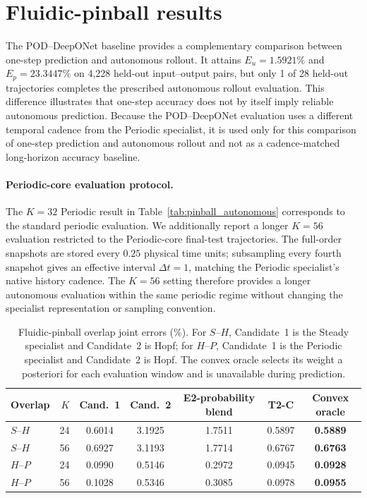 \documentclass{article}
\begin{document}
\FloatBarrier
\section{Fluidic-pinball results}
\label{app:pinball}

The POD--DeepONet baseline provides a complementary comparison between
one-step prediction and autonomous rollout. It attains $E_u=1.5921\%$ and $E_p=23.3447\%$ on 4,228 held-out input--output pairs, but only 1 of 28 held-out trajectories completes the prescribed autonomous rollout evaluation. This difference illustrates that one-step accuracy does not by itself imply reliable autonomous prediction. Because the POD--DeepONet evaluation uses a different temporal cadence from
the Periodic specialist, it is used only for this comparison of one-step prediction and autonomous rollout and not as a cadence-matched long-horizon accuracy baseline.

\paragraph{Periodic-core evaluation protocol.}
The $K=32$ Periodic result in Table~\ref{tab:pinball_autonomous} corresponds to the standard periodic evaluation. We additionally report a longer $K=56$ evaluation restricted to the Periodic-core final-test trajectories. The full-order snapshots are stored every $0.25$ physical time units; subsampling every fourth snapshot gives an effective interval $\Delta t=1$, matching the Periodic specialist's native history cadence. The $K=56$ setting therefore provides a longer autonomous evaluation within the same periodic regime without changing the specialist representation or
sampling convention.

\par
\begin{table}[H]
\centering
\caption{
Fluidic-pinball overlap joint errors (\%). For $S$--$H$, Candidate~1 is the Steady specialist and Candidate~2 is Hopf; for $H$--$P$, Candidate~1 is the Periodic specialist and Candidate~2 is Hopf.
The convex oracle selects its weight a posteriori for each evaluation window and is unavailable during prediction.
}
\label{tab:pinball_overlap}
\small
\setlength{\tabcolsep}{3.5pt}
\begin{tabular}{lrccccc}
\toprule
Overlap & $K$ & Cand.~1 & Cand.~2 & E2-probability blend & T2-C & Convex oracle \\
\midrule
$S$--$H$ & 24 & 0.6014 & 3.1925 & 1.7511 & 0.5897 & \textbf{0.5889} \\
$S$--$H$ & 56 & 0.6927 & 3.1193 & 1.7714 & 0.6767 & \textbf{0.6763} \\
$H$--$P$ & 24 & 0.0990 & 0.5146 & 0.2972 & 0.0945 & \textbf{0.0928} \\
$H$--$P$ & 56 & 0.1028 & 0.5346 & 0.3085 & 0.0978 & \textbf{0.0955} \\
\bottomrule
\end{tabular}
\end{table}
\par
\end{document}
